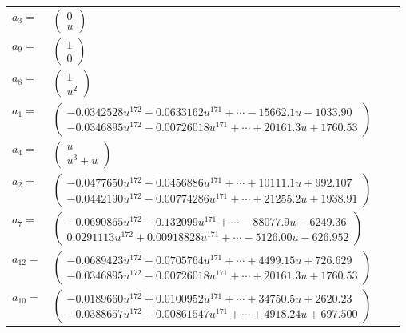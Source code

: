 \documentclass[1p]{elsarticle_modified}
\theoremstyle{definition}
\begin{document}
\begin{tabular}{m{7pt} m{180pt} m{7pt} m{180pt} }
\flushright $a_{3}=$&$\begin{pmatrix}0\\u\end{pmatrix}$ \\
\flushright $a_{9}=$&$\begin{pmatrix}1\\0\end{pmatrix}$ \\
\flushright $a_{8}=$&$\begin{pmatrix}1\\u^2\end{pmatrix}$ \\
\flushright $a_{1}=$&$\begin{pmatrix}-0.0342528 u^{172}-0.0633162 u^{171}+\cdots-15662.1 u-1033.90\\-0.0346895 u^{172}-0.00726018 u^{171}+\cdots+20161.3 u+1760.53\end{pmatrix}$ \\
\flushright $a_{4}=$&$\begin{pmatrix}u\\u^3+u\end{pmatrix}$ \\
\flushright $a_{2}=$&$\begin{pmatrix}-0.0477650 u^{172}-0.0456886 u^{171}+\cdots+10111.1 u+992.107\\-0.0442190 u^{172}-0.00774286 u^{171}+\cdots+21255.2 u+1938.91\end{pmatrix}$ \\
\flushright $a_{7}=$&$\begin{pmatrix}-0.0690865 u^{172}-0.132099 u^{171}+\cdots-88077.9 u-6249.36\\0.0291113 u^{172}+0.00918828 u^{171}+\cdots-5126.00 u-626.952\end{pmatrix}$ \\
\flushright $a_{12}=$&$\begin{pmatrix}-0.0689423 u^{172}-0.0705764 u^{171}+\cdots+4499.15 u+726.629\\-0.0346895 u^{172}-0.00726018 u^{171}+\cdots+20161.3 u+1760.53\end{pmatrix}$ \\
\flushright $a_{10}=$&$\begin{pmatrix}-0.0189660 u^{172}+0.0100952 u^{171}+\cdots+34750.5 u+2620.23\\-0.0388657 u^{172}-0.00861547 u^{171}+\cdots+4918.24 u+697.500\end{pmatrix}$ \\

\end{tabular}
\end{document}
